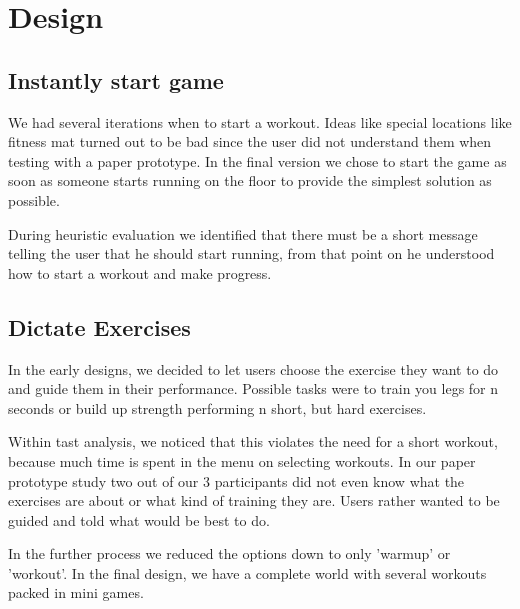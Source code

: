 \documentclass[twocolumn,showpacs,%
  nofootinbib,aps,superscriptaddress,%
  eqsecnum,prd,notitlepage,showkeys,10pt]{revtex4-1}
\begin{document}

\section{Design}

\subsection{Instantly start game}

We had several iterations when to start a workout. Ideas like special locations like fitness mat turned out to be bad since the user did not understand them  when testing with a paper prototype. In the final version we chose to start the game as soon as someone starts running on the floor to provide the simplest   solution as possible.

During heuristic evaluation we identified that there must be a short message telling the user that he should start running, from that point on he understood  how to start a workout and make progress.

\subsection{Dictate Exercises}

In the early designs, we decided to let users choose the exercise they want to do and guide them in their performance. Possible tasks were to train you legs  for n seconds or build up strength performing n short, but hard exercises.

Within tast analysis, we noticed that this violates the need for a short workout, because much time is spent in the menu on selecting workouts. In our paper  prototype study two out of our 3 participants did not even know what the exercises are about or what kind of training they are. Users rather wanted to be     guided and told what would be best to do.

In the further process we reduced the options down to only 'warmup' or 'workout'. In the final design, we have a complete world with several workouts packed  in mini games.
\end{document}
